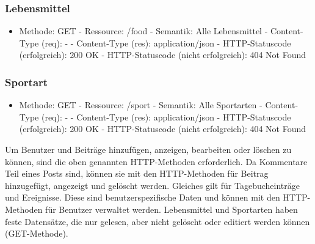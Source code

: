 		\subsubsection{Lebensmittel}
	\begin{itemize}
	\item Methode: GET\newline
	\noindent\hspace*{10mm} - Ressource: /food \newline
	\noindent\hspace*{10mm} - Semantik: Alle Lebensmittel \newline
	\noindent\hspace*{10mm} - Content-Type (req): - \newline
	\noindent\hspace*{10mm} - Content-Type (res): application/json \newline
	\noindent\hspace*{10mm} - HTTP-Statuscode (erfolgreich): 200 OK \newline
	\noindent\hspace*{10mm} - HTTP-Statuscode (nicht erfolgreich): 404 Not Found
	\end{itemize}
\subsubsection{Sportart}
\begin{itemize}
	\item Methode: GET\newline
	\noindent\hspace*{10mm} - Ressource: /sport \newline
	\noindent\hspace*{10mm} - Semantik: Alle Sportarten \newline
	\noindent\hspace*{10mm} - Content-Type (req): - \newline
	\noindent\hspace*{10mm} - Content-Type (res): application/json \newline
	\noindent\hspace*{10mm} - HTTP-Statuscode (erfolgreich): 200 OK \newline
	\noindent\hspace*{10mm} - HTTP-Statuscode (nicht erfolgreich): 404 Not Found
	\end{itemize}
	Um Benutzer und Beiträge hinzufügen, anzeigen, bearbeiten oder löschen zu können, sind die oben genannten HTTP-Methoden erforderlich. Da Kommentare Teil eines Posts sind, können sie mit den HTTP-Methoden für \glqq Beitrag\grqq{} hinzugefügt, angezeigt und gelöscht werden. Gleiches gilt für Tagebucheinträge und Ereignisse. Diese sind benutzerspezifische Daten und können mit den HTTP-Methoden für \glqq Benutzer\grqq{} verwaltet werden.\newline
	Lebensmittel und Sportarten haben feste Datensätze, die nur gelesen, aber nicht gelöscht oder editiert werden können (GET-Methode).
